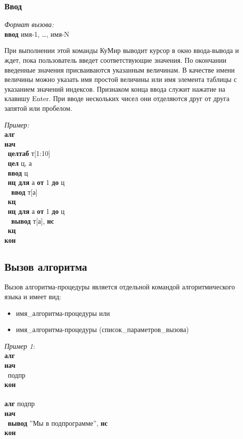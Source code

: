 \documentclass[12pt,a4paper]{article}
\newcommand{\otstup}{\textperiodcentered\ }
\begin{document}
\subsubsection{Ввод}

\emph{Формат вызова:}\\
\textsf{\textbf{ввод} имя-1, \dots, имя-N}

При выполнении этой команды КуМир выводит курсор в окно ввода-вывода и ждет, пока пользователь введет соответствующие значения. По окончании введенные значения присваиваются указанным величинам. В качестве имени величины можно указать имя  простой величины или имя элемента таблицы с указанием значений индексов. Признаком конца ввода служит нажатие на клавишу Enter. При вводе нескольких чисел они отделяются друг от друга запятой или пробелом. 

\emph{Пример:}\\
{\sffamily
\textbf{алг}\\
\textbf{нач}\\
\otstup \textbf{целтаб} т[1:10]\\
\otstup \textbf{цел} ц, а\\
\otstup \textbf{ввод} ц\\
\otstup \textbf{нц для} а \textbf{от} 1 \textbf{до} ц\\
\otstup \otstup \textbf{ввод} т[а]\\
\otstup \textbf{кц}\\
\otstup \textbf{нц для} а \textbf{от} 1 \textbf{до} ц\\
\otstup \otstup \textbf{вывод} т[а], \textbf{нс}\\
\otstup \textbf{кц}\\
\textbf{кон}
}

\subsection{Вызов алгоритма}
\label{algcalling}

Вызов алгоритма-процедуры является отдельной командой алгоритмического языка и имеет вид:
\begin{itemize}
\item \textsf{имя\_алгоритма-процедуры} или
\item \textsf{имя\_алгоритма-процедуры (список\_параметров\_вызова)}
\end{itemize}

\emph{Пример 1}:\\
{\sffamily
\textbf{алг}\\
\textbf{нач}\\
\otstup подпр\\
\textbf{кон}\\
~\\
\textbf{алг} подпр\\
\textbf{нач}\\
\otstup \textbf{вывод} ''Мы в подпрограмме'', \textbf{нс}\\
\textbf{кон}
}
\end{document}
